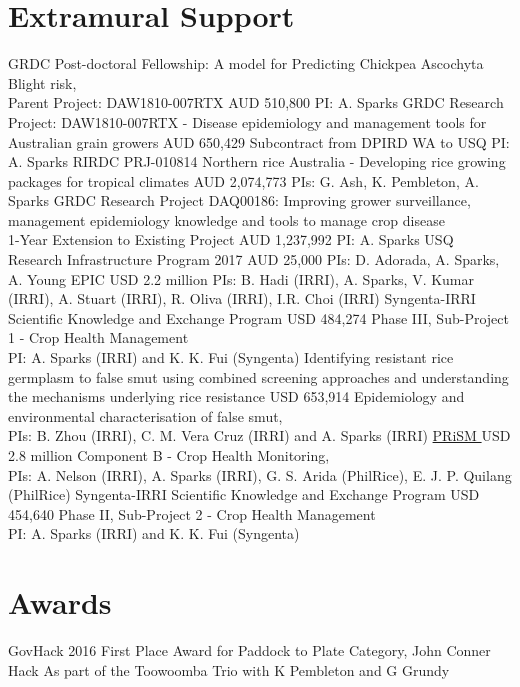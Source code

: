 \section*{Extramural Support}
  \begin{entrylist}
			{GRDC Post-doctoral Fellowship: A model for Predicting Chickpea Ascochyta Blight risk,\\Parent Project: DAW1810-007RTX}
			{AUD 510,800}
			{PI: A. Sparks}
			{GRDC Research Project: DAW1810-007RTX - Disease epidemiology and management tools for Australian grain growers}
			{AUD 650,429}
			{Subcontract from DPIRD WA to USQ PI: A. Sparks}
			{RIRDC PRJ-010814 Northern rice Australia - Developing rice growing packages for tropical climates}
			{AUD 2,074,773}
			{PIs: G. Ash, K. Pembleton, A. Sparks}
			{GRDC Research Project DAQ00186: Improving grower surveillance, management epidemiology knowledge and tools to manage crop disease\\1-Year Extension to Existing Project}
			{AUD 1,237,992}
			{PI: A. Sparks}
      {USQ Research Infrastructure Program 2017}
      {AUD 25,000}
      {PIs: D. Adorada, A. Sparks, A. Young}
      {EPIC }
      {USD 2.2 million}
      {PIs: B. Hadi (IRRI), A. Sparks, V. Kumar (IRRI), A. Stuart (IRRI), R. Oliva (IRRI), I.R. Choi (IRRI)}
	    {Syngenta-IRRI Scientific Knowledge and Exchange Program}
	    {USD 484,274}
	    {Phase III, Sub-Project 1 - Crop Health Management\\PI: A. Sparks (IRRI) and K. K. Fui (Syngenta)}
      {Identifying resistant rice germplasm to false smut using combined screening approaches and understanding the mechanisms underlying rice resistance}
      {USD 653,914}
      {Epidemiology and environmental characterisation of false smut,\\PIs: B. Zhou (IRRI), C. M. {Vera Cruz} (IRRI) and A. Sparks (IRRI)}
	    {\href{http://philippinericeinfo.ph/}{PRiSM }}
	    {USD 2.8 million}
	    {Component B - Crop Health Monitoring,\\PIs: A. Nelson (IRRI), A. Sparks (IRRI), G. S. Arida (PhilRice), E. J. P. Quilang (PhilRice)}
	    {Syngenta-IRRI Scientific Knowledge and Exchange Program}
	    {USD 454,640}
	    {Phase II, Sub-Project 2 - Crop Health Management\\PI: A. Sparks (IRRI) and K. K. Fui (Syngenta)}
\end{entrylist}

\section*{Awards}
  \begin{entrylist}
    {GovHack 2016 First Place Award for Paddock to Plate Category, John Conner Hack}
    {}
    {As part of the Toowoomba Trio with K Pembleton and G Grundy}
  \end{entrylist}
